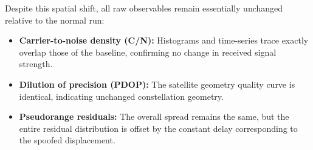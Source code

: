         \noindent Despite this spatial shift, all raw observables remain essentially unchanged relative to the normal run:
        
        \begin{itemize}
            \item \textbf{Carrier-to-noise density (C/N):} Histograms and time-series trace exactly overlap those of the baseline, confirming no change in received signal strength.
            \item \textbf{Dilution of precision (PDOP):} The satellite geometry quality curve is identical, indicating unchanged constellation geometry.
            \item \textbf{Pseudorange residuals:} The overall spread remains the same, but the entire residual distribution is offset by the constant delay corresponding to the spoofed displacement.
        \end{itemize}

